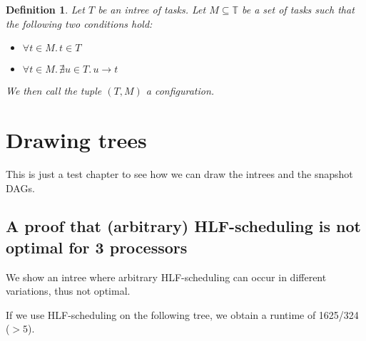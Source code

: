 \documentclass[letter]{report}
\newtheorem{definition}{Definition}[chapter]
\newcommand{\alltasks}{{\mathbb T}}
\newcommand{\neededfor}{\rightarrow}
\begin{document}
\begin{definition}
  Let $T$ be an intree of tasks. Let $M\subseteq\alltasks$ be a set of tasks such that the following two conditions hold:
  \begin{itemize}
  \item $\forall t\in M.\, t \in T$
  \item $\forall t\in M.\, \nexists u \in T.\, u\neededfor t $
  \end{itemize}
  We then call the tuple $\left( T, M \right)$ a \emph{configuration}.
\end{definition}

\chapter{Drawing trees}
\label{chap:drawing-trees}

This is just a test chapter to see how we can draw the intrees and the snapshot DAGs.
\newsavebox{\nodebox}

\section{A proof that (arbitrary) HLF-scheduling is not optimal for 3 processors}
\label{sec:arb-hlf-not-optimal-for-3-procs}

We show an intree where arbitrary HLF-scheduling can occur in different variations, thus not optimal.

If we use HLF-scheduling on the following tree, we obtain a runtime of 1625/324 ($>5$).
\end{document}
